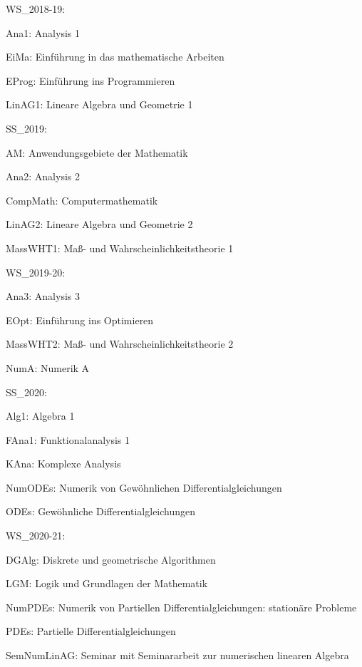 
WS_2018-19:

Ana1:
Analysis 1

EiMa:
Einführung in das mathematische Arbeiten

EProg:
Einführung ins Programmieren

LinAG1:
Lineare Algebra und Geometrie 1


SS_2019:

AM:
Anwendungsgebiete der Mathematik

Ana2:
Analysis 2

CompMath:
Computermathematik

LinAG2:
Lineare Algebra und Geometrie 2

MassWHT1:
Maß- und Wahrscheinlichkeitstheorie 1


WS_2019-20:

Ana3:
Analysis 3

EOpt:
Einführung ins Optimieren

MassWHT2:
Maß- und Wahrscheinlichkeitstheorie 2

NumA:
Numerik A


SS_2020:

Alg1:
Algebra 1

FAna1:
Funktionalanalysis 1

KAna:
Komplexe Analysis

NumODEs:
Numerik von Gewöhnlichen Differentialgleichungen

ODEs:
Gewöhnliche Differentialgleichungen


WS_2020-21:

DGAlg:
Diskrete und geometrische Algorithmen

LGM:
Logik und Grundlagen der Mathematik

NumPDEs:
Numerik von Partiellen Differentialgleichungen: stationäre Probleme

PDEs:
Partielle Differentialgleichungen

SemNumLinAG:
Seminar mit Seminararbeit zur numerischen linearen Algebra

